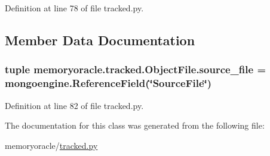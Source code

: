Definition at line 78 of file tracked.\+py.



\subsection{Member Data Documentation}
\hypertarget{classmemoryoracle_1_1tracked_1_1ObjectFile_a7901128346e4f5cd70932b751051fe58}{}
\subsubsection[{source\+\_\+file}]{\setlength{\rightskip}{0pt plus 5cm}tuple memoryoracle.\+tracked.\+Object\+File.\+source\+\_\+file = mongoengine.\+Reference\+Field(\char`\"{}Source\+File\char`\"{})\hspace{0.3cm}{\ttfamily [static]}}\label{classmemoryoracle_1_1tracked_1_1ObjectFile_a7901128346e4f5cd70932b751051fe58}


Definition at line 82 of file tracked.\+py.



The documentation for this class was generated from the following file\+:\begin{DoxyCompactItemize}
\item 
memoryoracle/\hyperlink{tracked_8py}{tracked.\+py}\end{DoxyCompactItemize}
